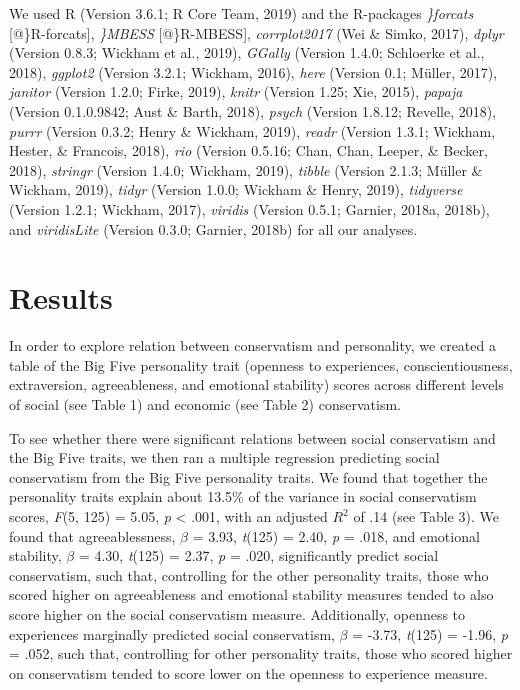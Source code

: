 \documentclass[man]{apa6}
\begin{document}
We used R (Version 3.6.1; R Core Team, 2019) and the R-packages \emph{\}forcats} {[}@\}R-forcats{]}, \emph{\}MBESS} {[}@\}R-MBESS{]}, \emph{corrplot2017} (Wei \& Simko, 2017), \emph{dplyr} (Version 0.8.3; Wickham et al., 2019), \emph{GGally} (Version 1.4.0; Schloerke et al., 2018), \emph{ggplot2} (Version 3.2.1; Wickham, 2016), \emph{here} (Version 0.1; Müller, 2017), \emph{janitor} (Version 1.2.0; Firke, 2019), \emph{knitr} (Version 1.25; Xie, 2015), \emph{papaja} (Version 0.1.0.9842; Aust \& Barth, 2018), \emph{psych} (Version 1.8.12; Revelle, 2018), \emph{purrr} (Version 0.3.2; Henry \& Wickham, 2019), \emph{readr} (Version 1.3.1; Wickham, Hester, \& Francois, 2018), \emph{rio} (Version 0.5.16; Chan, Chan, Leeper, \& Becker, 2018), \emph{stringr} (Version 1.4.0; Wickham, 2019), \emph{tibble} (Version 2.1.3; Müller \& Wickham, 2019), \emph{tidyr} (Version 1.0.0; Wickham \& Henry, 2019), \emph{tidyverse} (Version 1.2.1; Wickham, 2017), \emph{viridis} (Version 0.5.1; Garnier, 2018a, 2018b), and \emph{viridisLite} (Version 0.3.0; Garnier, 2018b) for all our analyses.

\hypertarget{results}{%
\section{Results}\label{results}}

In order to explore relation between conservatism and personality, we created a table of the Big Five personality trait (openness to experiences, conscientiousness, extraversion, agreeableness, and emotional stability) scores across different levels of social (see Table 1) and economic (see Table 2) conservatism.

To see whether there were significant relations between social conservatism and the Big Five traits, we then ran a multiple regression predicting social conservatism from the Big Five personality traits. We found that together the personality traits explain about 13.5\% of the variance in social conservatism scores, \emph{F}(5, 125) = 5.05, \emph{p} \textless{} .001, with an adjusted \(R^2\) of .14 (see Table 3). We found that agreeablessness, \(\beta\) = 3.93, \emph{t}(125) = 2.40, \emph{p} = .018, and emotional stability, \(\beta\) = 4.30, \emph{t}(125) = 2.37, \emph{p} = .020, significantly predict social conservatism, such that, controlling for the other personality traits, those who scored higher on agreeableness and emotional stability measures tended to also score higher on the social conservatism measure. Additionally, openness to experiences marginally predicted social conservatism, \(\beta\) = -3.73, \emph{t}(125) = -1.96, \emph{p} = .052, such that, controlling for other personality traits, those who scored higher on conservatism tended to score lower on the openness to experience measure.
\end{document}
